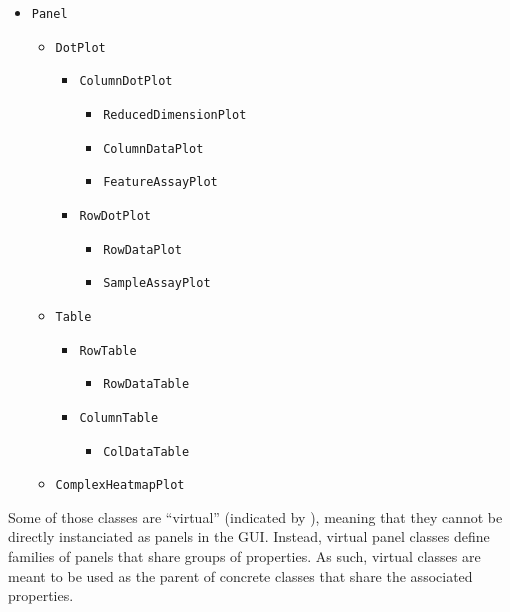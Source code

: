 \documentclass[]{book}
\providecommand{\tightlist}{%
  \setlength{\itemsep}{0pt}\setlength{\parskip}{0pt}}
\begin{document}
\begin{itemize}
\tightlist
\item
  \texttt{Panel}

  \begin{itemize}
  \tightlist
  \item
    \texttt{DotPlot}

    \begin{itemize}
    \tightlist
    \item
      \texttt{ColumnDotPlot}

      \begin{itemize}
      \tightlist
      \item
        \texttt{ReducedDimensionPlot}
      \item
        \texttt{ColumnDataPlot}
      \item
        \texttt{FeatureAssayPlot}
      \end{itemize}
    \item
      \texttt{RowDotPlot}

      \begin{itemize}
      \tightlist
      \item
        \texttt{RowDataPlot}
      \item
        \texttt{SampleAssayPlot}
      \end{itemize}
    \end{itemize}
  \item
    \texttt{Table}

    \begin{itemize}
    \tightlist
    \item
      \texttt{RowTable}

      \begin{itemize}
      \tightlist
      \item
        \texttt{RowDataTable}
      \end{itemize}
    \item
      \texttt{ColumnTable}

      \begin{itemize}
      \tightlist
      \item
        \texttt{ColDataTable}
      \end{itemize}
    \end{itemize}
  \item
    \texttt{ComplexHeatmapPlot}
  \end{itemize}
\end{itemize}

Some of those classes are ``virtual'' (indicated by ), meaning that they
cannot be directly instanciated as panels in the GUI. Instead, virtual
panel classes define families of panels that share groups of properties.
As such, virtual classes are meant to be used as the parent of concrete
classes that share the associated properties.
\end{document}
